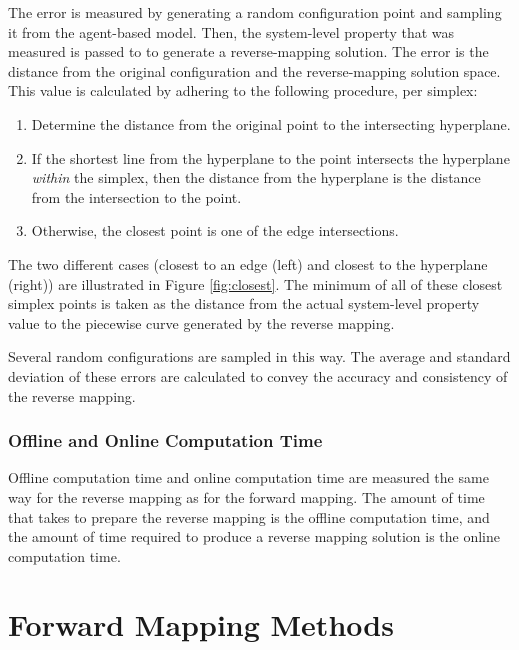 The error is measured by generating a random configuration point and sampling it from the agent-based model.
Then, the system-level property that was measured is passed to \fw to generate a reverse-mapping solution.
The error is the distance from the original configuration and the reverse-mapping solution space.
This value is calculated by adhering to the following procedure, per simplex:
\begin{enumerate}
  \item Determine the distance from the original point to the intersecting hyperplane.
  \item If the shortest line from the hyperplane to the point intersects the hyperplane \textit{within} the simplex, then the distance from the hyperplane is the distance from the intersection to the point.
  \item Otherwise, the closest point is one of the edge intersections.
\end{enumerate}
The two different cases (closest to an edge (left) and closest to the hyperplane (right)) are illustrated in Figure \ref{fig:closest}.
The minimum of all of these closest simplex points is taken as the distance from the actual system-level property value to the piecewise curve generated by the reverse mapping.


Several random configurations are sampled in this way.
The average and standard deviation of these errors are calculated to convey the accuracy and consistency of the reverse mapping.

  \subsubsection{Offline and Online Computation Time}
Offline computation time and online computation time are measured the same way for the reverse mapping as for the forward mapping.
The amount of time that \fw takes to prepare the reverse mapping is the offline computation time, and the amount of time required to produce a reverse mapping solution is the online computation time.



\section{Forward Mapping Methods}\label{sec:fmalgo}

